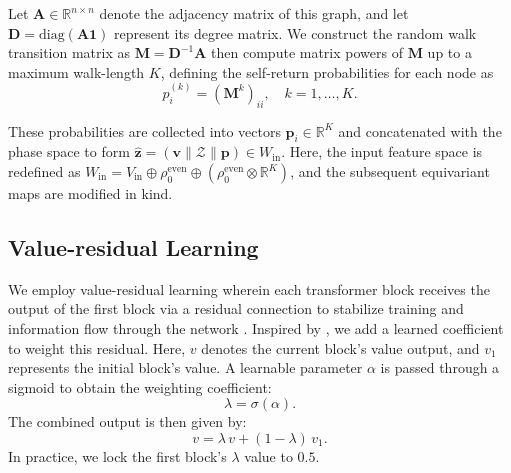 Let $\mathbf{A} \in \mathbb{R}^{n \times n}$ denote the adjacency matrix of this graph, and let $\mathbf{D} = \text{diag}(\mathbf{A}\mathbf{1})$ represent its degree matrix. We construct the random walk transition matrix as \(\mathbf{M} = \mathbf{D}^{-1} \mathbf{A}\) then compute matrix powers of $\mathbf{M}$ up to a maximum walk-length $K$, defining the self-return probabilities for each node as
\begin{equation}
    p_i^{(k)} = \left(\mathbf{M}^k\right)_{ii}, \quad k = 1, \dots, K.
\end{equation}

These probabilities are collected into vectors $\mathbf{p}_i \in \mathbb{R}^{K}$ and concatenated with the phase space to form \(\hat{\mathbf{z}} = \left(\mathbf{v} \parallel \mathcal{Z} \parallel \mathbf{p}\right) \in W_\text{in}\). Here, the input feature space is redefined as \(W_\text{in} = V_\text{in} \oplus \rho_0^\text{even} \oplus \left(\rho_0^\text{even} \otimes \mathbb{R}^{K}\right)\), and the subsequent equivariant maps are modified in kind.

\subsection{Value-residual Learning}
\label{sec:value_residuals}
We employ value-residual learning wherein each transformer block receives the output of the first block via a residual connection to stabilize training and information flow through the network \cite{zhou_value_2024}. Inspired by \cite{jordan_nanogpt_2024}, we add a learned coefficient to weight this residual. Here, \(v\) denotes the current block's value output, and \(v_1\) represents the initial block's value. A learnable parameter \(\alpha\) is passed through a sigmoid to obtain the weighting coefficient:
\begin{equation}
    \lambda = \sigma(\alpha).
\end{equation}
The combined output is then given by:
\begin{equation}
    v = \lambda\,v + (1 - \lambda)\,v_1.
\end{equation}
In practice, we lock the first block's \(\lambda\) value to \(0.5\). 




